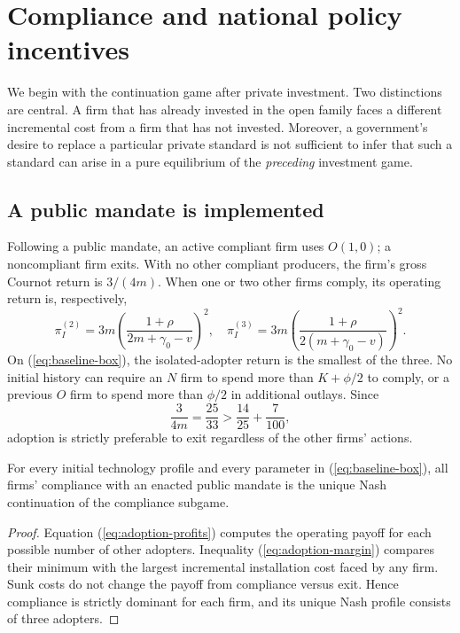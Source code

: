 \section{Compliance and national policy incentives}\label{sec:policy}

We begin with the continuation game after private investment. Two distinctions are central. A firm that has already invested in the open family faces a different incremental cost from a firm that has not invested. Moreover, a government's desire to replace a particular private standard is not sufficient to infer that such a standard can arise in a pure equilibrium of the \emph{preceding} investment game.

\subsection{A public mandate is implemented}\label{subsec:adoption}

Following a public mandate, an active compliant firm uses \(O(1,0)\); a noncompliant firm exits. With no other compliant producers, the firm's gross Cournot return is \(3/(4m)\). When one or two other firms comply, its operating return is, respectively,
\begin{equation}
 \pi_I^{(2)}
 =3m\left(\frac{1+\rho}{2m+\gamma_0-v}\right)^2,
 \quad
 \pi_I^{(3)}
 =3m\left(\frac{1+\rho}{2(m+\gamma_0-v)}\right)^2.
 \label{eq:adoption-profits}
\end{equation}
On (\ref{eq:baseline-box}), the isolated-adopter return is the smallest of the three. No initial history can require an \(N\) firm to spend more than \(K+\phi/2\) to comply, or a previous \(O\) firm to spend more than \(\phi/2\) in additional outlays. Since
\begin{equation}
 \frac{3}{4m}=\frac{25}{33}
 >\frac{14}{25}+\frac{7}{100},
 \label{eq:adoption-margin}
\end{equation}
adoption is strictly preferable to exit regardless of the other firms' actions.

\begin{lemma}\label{lem:adoption}
For every initial technology profile and every parameter in
(\ref{eq:baseline-box}), all firms' compliance with an enacted public
mandate is the unique Nash continuation of the compliance subgame.
\end{lemma}
\begin{proof}
Equation (\ref{eq:adoption-profits}) computes the operating payoff for
each possible number of other adopters. Inequality
(\ref{eq:adoption-margin}) compares their minimum with the largest
incremental installation cost faced by any firm. Sunk costs do not
change the payoff from compliance versus exit. Hence compliance is
strictly dominant for each firm, and its unique Nash profile consists
of three adopters.
\end{proof}

